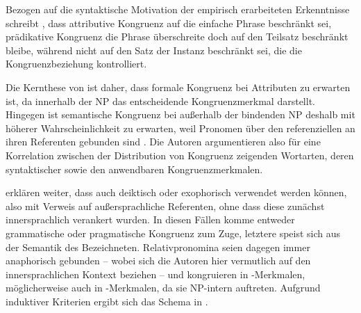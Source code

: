 Bezogen auf die syntaktische Motivation der empirisch erarbeiteten Erkenntnisse
schreibt \citet[216]{corbett1979}, dass attributive
Kongruenz auf die einfache Phrase beschränkt sei,
prädikative Kongruenz die Phrase überschreite doch
auf den Teilsatz beschränkt bleibe, während  nicht auf
den Satz der Instanz beschränkt sei, die die
Kongruenzbeziehung kontrolliert.

Die Kernthese von \citet{wechslerzlatic2003} ist daher, dass formale
Kongruenz bei Attributen zu erwarten ist, da
innerhalb der NP  das entscheidende
Kongruenzmerkmal darstellt. Hingegen ist semantische
Kongruenz bei  außerhalb der
bindenden NP deshalb mit höherer Wahrscheinlichkeit zu erwarten, weil Pronomen
über den referenziellen  an ihren Referenten gebunden sind
\autocite[89--91]{wechslerzlatic2003}. Die Autoren argumentieren also für eine
Korrelation zwischen der Distribution von
Kongruenz zeigenden Wortarten, deren syntaktischer  sowie den
anwendbaren Kongruenz\-merkmalen.

\citet[89]{wechslerzlatic2003} erklären weiter, dass 
auch deiktisch oder exophorisch verwendet werden können, also mit Verweis auf
außersprachliche Referenten, ohne dass diese zunächst innersprachlich
verankert wurden. In diesen Fällen komme entweder grammatische
oder pragmatische Kongruenz zum Zuge, letztere speist sich aus
der Semantik des Bezeichneten. Relativpronomina seien dagegen immer
anaphorisch gebunden -- wobei sich die Autoren hier vermutlich auf
den innersprachlichen Kontext beziehen -- und kongruieren in
-Merkmalen, möglicherweise auch in -Merkmalen, da sie
NP-intern auftreten. Aufgrund
induktiver Kriterien ergibt sich das Schema in .

